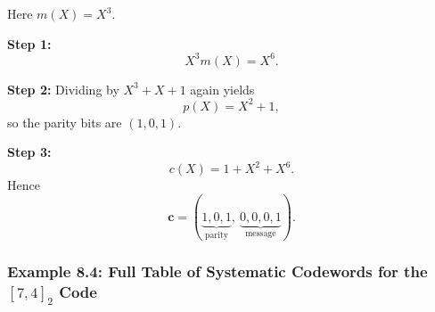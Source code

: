 \documentclass[11pt,oneside]{book}
\theoremstyle{plain}
\theoremstyle{definition}
\theoremstyle{remark}
\begin{document}
Here \(m(X)=X^3\).

\textbf{Step 1:} \[X^3m(X)=X^6.\]

\textbf{Step 2:} Dividing by \(X^3+X+1\) again yields \[p(X)=X^2+1,\] so
the parity bits are \((1,0,1)\).

\textbf{Step 3:} \[c(X)=1+X^2+X^6.\] Hence
\[\mathbf{c}=(\underbrace{1,0,1}_{\text{parity}},\ \underbrace{0,0,0,1}_{\text{message}}).\]

\subsubsection{\texorpdfstring{Example 8.4: Full Table of Systematic
Codewords for the \([7,4]_2\)
Code}{Example 8.4: Full Table of Systematic Codewords for the {[}7,4{]}\_2 Code}}\label{example-8.4-full-table-of-systematic-codewords-for-the-74_2-code}
\end{document}
